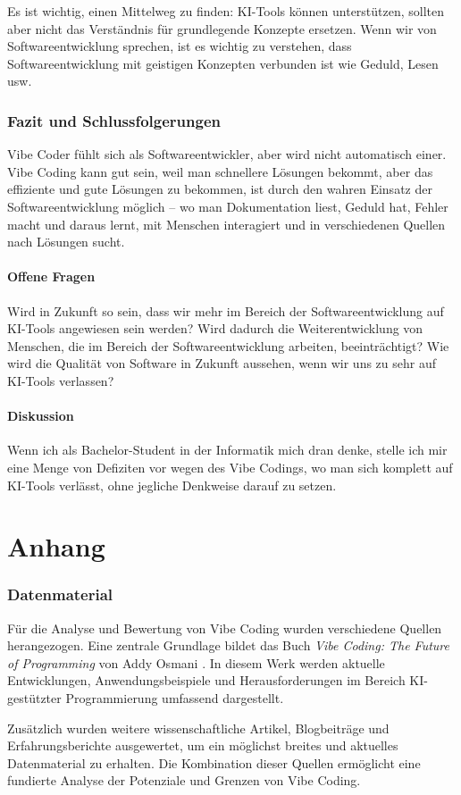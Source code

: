 \documentclass[paper=a4,fontsize=12pt,ngerman]{scrartcl}
\begin{document}
Es ist wichtig, einen Mittelweg zu finden: KI-Tools können unterstützen, sollten aber nicht das Verständnis für grundlegende Konzepte ersetzen.
Wenn wir von Softwareentwicklung sprechen, ist es wichtig zu verstehen, dass Softwareentwicklung mit geistigen Konzepten verbunden ist wie Geduld, Lesen usw.

\clearpage
\section{Fazit und Schlussfolgerungen}
Vibe Coder fühlt sich als Softwareentwickler, aber wird nicht automatisch einer. 
Vibe Coding kann gut sein, weil man schnellere Lösungen bekommt, aber das effiziente und gute Lösungen zu bekommen, ist durch den wahren Einsatz der Softwareentwicklung möglich – wo man Dokumentation liest, Geduld hat, Fehler macht und daraus lernt, mit Menschen interagiert und in verschiedenen Quellen nach Lösungen sucht.

\subsection{Offene Fragen}
Wird in Zukunft so sein, dass wir mehr im Bereich der Softwareentwicklung auf KI-Tools angewiesen sein werden?  
Wird dadurch die Weiterentwicklung von Menschen, die im Bereich der Softwareentwicklung arbeiten, beeinträchtigt?  
Wie wird die Qualität von Software in Zukunft aussehen, wenn wir uns zu sehr auf KI-Tools verlassen?

\subsection{Diskussion}
Wenn ich als Bachelor-Student in der Informatik mich dran denke, stelle ich mir eine Menge von Defiziten vor wegen des Vibe Codings, wo man sich komplett auf KI-Tools verlässt, ohne jegliche Denkweise darauf zu setzen.

\renewcommand\refname{Literaturverzeichnis}



\clearpage
\appendix
\part*{Anhang}

\section{Datenmaterial}
Für die Analyse und Bewertung von Vibe Coding wurden verschiedene Quellen herangezogen. Eine zentrale Grundlage bildet das Buch \textit{Vibe Coding: The Future of Programming} von Addy Osmani \citep{VibeCodingTheFutureOfProgramming}. In diesem Werk werden aktuelle Entwicklungen, Anwendungsbeispiele und Herausforderungen im Bereich KI-gestützter Programmierung umfassend dargestellt.

Zusätzlich wurden weitere wissenschaftliche Artikel, Blogbeiträge und Erfahrungsberichte ausgewertet, um ein möglichst breites und aktuelles Datenmaterial zu erhalten. Die Kombination dieser Quellen ermöglicht eine fundierte Analyse der Potenziale und Grenzen von Vibe Coding.
\end{document}

